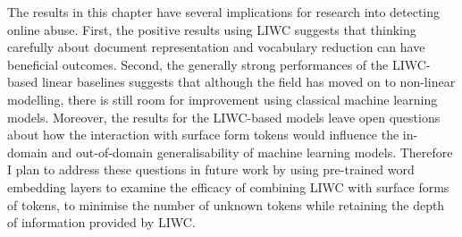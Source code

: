 The results in this chapter have several implications for research into detecting online abuse. First, the positive results using LIWC suggests that thinking carefully about document representation and vocabulary reduction can have beneficial outcomes. Second, the generally strong performances of the LIWC-based linear baselines suggests that although the field has moved on to non-linear modelling, there is still room for improvement using classical machine learning models. Moreover, the results for the LIWC-based models leave open questions about how the interaction with surface form tokens would influence the in-domain and out-of-domain generalisability of machine learning models. Therefore I plan to address these questions in future work by using pre-trained word embedding layers to examine the efficacy of combining LIWC with surface forms of tokens, to minimise the number of unknown tokens while retaining the depth of information provided by LIWC.
